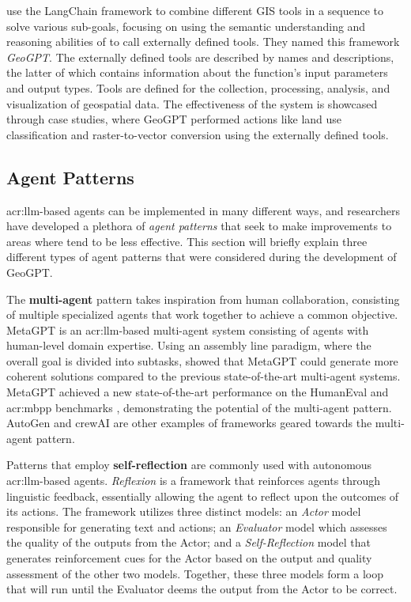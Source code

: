 \cite{zhangGeoGPTUnderstandingProcessing2023} use the LangChain framework to combine different GIS tools in a sequence to solve various sub-goals, focusing on using the semantic understanding and reasoning abilities of  to call externally defined tools. They named this framework \textit{GeoGPT}. The externally defined tools are described by names and descriptions, the latter of which contains information about the function's input parameters and output types. Tools are defined for the collection, processing, analysis, and visualization of geospatial data. The effectiveness of the system is showcased through case studies, where GeoGPT performed actions like land use classification and raster-to-vector conversion using the externally defined tools.


\subsection{Agent Patterns}
\label{subsec:agent-patterns}

\acrshort{acr:llm}-based agents can be implemented in many different ways, and researchers have developed a plethora of \textit{agent patterns} that seek to make improvements to areas where  tend to be less effective. This section will briefly explain three different types of agent patterns that were considered during the development of GeoGPT.

The \textbf{multi-agent} pattern takes inspiration from human collaboration, consisting of multiple specialized agents that work together to achieve a common objective. MetaGPT \citep{hongMetaGPTMetaProgramming2023} is an \acrshort{acr:llm}-based multi-agent system consisting of agents with human-level domain expertise. Using an assembly line paradigm, where the overall goal is divided into subtasks, \citeauthor{hongMetaGPTMetaProgramming2023} showed that MetaGPT could generate more coherent solutions compared to the previous state-of-the-art multi-agent systems. MetaGPT achieved a new state-of-the-art performance on the HumanEval and \gls{acr:mbpp} benchmarks \citep[7]{hongMetaGPTMetaProgramming2023}, demonstrating the potential of the multi-agent pattern. AutoGen \citep{wuAutoGenEnablingNextGen2023a} and crewAI \citep{mouraJoaomdmouraCrewAI2024} are other examples of frameworks geared towards the multi-agent pattern.

Patterns that employ \textbf{self-reflection} are commonly used with autonomous \acrshort{acr:llm}-based agents. \textit{Reflexion} \citep{shinnReflexionLanguageAgents2023} is a framework that reinforces agents through linguistic feedback, essentially allowing the agent to reflect upon the outcomes of its actions. The framework utilizes three distinct models: an \textit{Actor} model responsible for generating text and actions; an \textit{Evaluator} model which assesses the quality of the outputs from the Actor; and a \textit{Self-Reflection} model that generates reinforcement cues for the Actor based on the output and quality assessment of the other two models. Together, these three models form a loop that will run until the Evaluator deems the output from the Actor to be correct.

